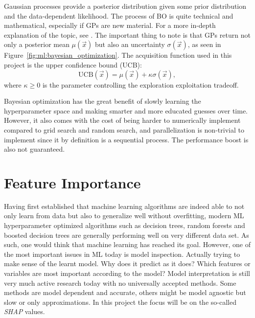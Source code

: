 Gaussian processes provide a posterior distribution given some prior distribution and the data-dependent likelihood. The process of BO is quite technical and mathematical, especially if GPs are new material. For a more in-depth explanation of the topic, see \citet{brochuTutorialBayesianOptimization2010}. The important thing to note is that GPs return not only a posterior mean $\mu(\vec{x})$ but also an uncertainty $\sigma(\vec{x})$, as seen in Figure~\ref{fig:ml:bayesian_optimization}. The acquisition function used in this project is the upper confidence bound (UCB):
\begin{equation}
  \mathrm{UCB}(\vec{x}) = \mu(\vec{x}) + \kappa \sigma(\vec{x}),
\end{equation}
where $\kappa \geq 0$ is the parameter controlling the exploration exploitation tradeoff. 

Bayesian optimization has the great benefit of slowly learning the hyperparameter space and making smarter and more educated guesses over time. However, it also comes with the cost of being harder to numerically implement compared to grid search and random search, and parallelization is non-trivial to implement since it by definition is a sequential process. The performance boost is also not guaranteed. 

\section{Feature Importance}
\label{sec:ml:feature_importance}
Having first established that machine learning algorithms are indeed able to not only learn from data but also to generalize well without overfitting, modern ML hyperparameter optimized algorithms such as decision trees, random forests and boosted decision trees are generally performing well on very different data set. As such, one would think that machine learning has reached its goal. However, one of the most important issues in ML today is model inspection. Actually trying to make sense of the learnt model. Why does it predict as it does? Which features or variables are most important according to the model? Model interpretation is still very much active research today with no universally accepted methods. Some methods are model dependent and accurate, others might be model agnostic but slow or only approximations. In this project the focus will be on the so-called \emph{SHAP} values. 

